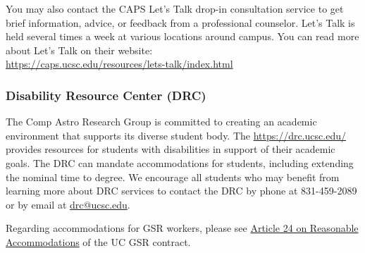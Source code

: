 \noindent
You may also contact the CAPS Let’s Talk drop-in consultation service to get brief information, advice, or feedback from a professional counselor. Let’s Talk is held several times a week at various locations around campus. You can read more about Let’s Talk on their website: \\

\noindent
\href{https://caps.ucsc.edu/resources/lets-talk/index.html}{https://caps.ucsc.edu/resources/lets-talk/index.html}\\

\subsubsection{Disability Resource Center (DRC)}

The Comp Astro Research Group is committed to creating an academic environment that supports its diverse
student body.  The \href{UCSC Disability Resource Center (DRC)}{https://drc.ucsc.edu/} provides resources for students with disabilities in support of their academic goals. The DRC can mandate accommodations for students, including extending the nominal time to degree. 
We encourage all students who may benefit from learning more about DRC services to contact the DRC by
phone at 831-459-2089 or by email at \href{mailto:drc@ucsc.edu}{drc@ucsc.edu}.

Regarding accommodations for GSR workers, please see \href{https://ucnet.universityofcalifornia.edu/wp-content/uploads/labor/bargaining-units/br/docs/br_24_reasonable-accommodation_2022-2025.pdf}{Article 24 on Reasonable Accommodations} of the UC GSR contract.
